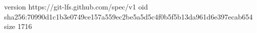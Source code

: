 version https://git-lfs.github.com/spec/v1
oid sha256:70990d1c1b3e0749ce157a559ec2be5a5d5c4f0b5f5b13da961d6e397ecab654
size 1716
